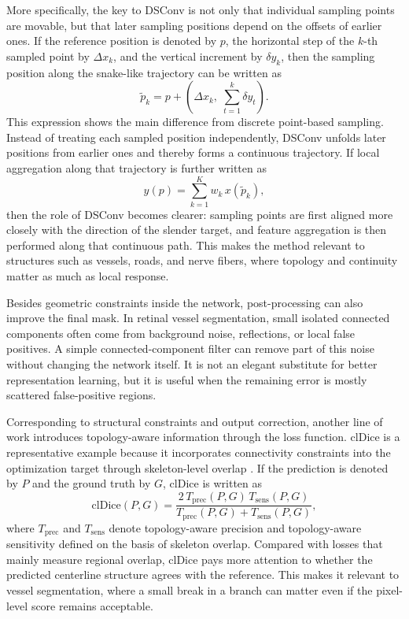 \documentclass[a4paper,11pt]{article}
\begin{document}
More specifically, the key to DSConv is not only that individual sampling points are movable, but that later sampling positions depend on the offsets of earlier ones. If the reference position is denoted by \(p\), the horizontal step of the \(k\)-th sampled point by \(\Delta x_k\), and the vertical increment by \(\delta y_k\), then the sampling position along the snake-like trajectory can be written as
\begin{equation}
\tilde{p}_k = p + \left(\Delta x_k,\; \sum_{t=1}^{k}\delta y_t\right).
\end{equation}
This expression shows the main difference from discrete point-based sampling. Instead of treating each sampled position independently, DSConv unfolds later positions from earlier ones and thereby forms a continuous trajectory. If local aggregation along that trajectory is further written as
\begin{equation}
y(p)=\sum_{k=1}^{K} w_k\,x(\tilde{p}_k),
\end{equation}
then the role of DSConv becomes clearer: sampling points are first aligned more closely with the direction of the slender target, and feature aggregation is then performed along that continuous path. This makes the method relevant to structures such as vessels, roads, and nerve fibers, where topology and continuity matter as much as local response.

Besides geometric constraints inside the network, post-processing can also improve the final mask. In retinal vessel segmentation, small isolated connected components often come from background noise, reflections, or local false positives. A simple connected-component filter can remove part of this noise without changing the network itself. It is not an elegant substitute for better representation learning, but it is useful when the remaining error is mostly scattered false-positive regions.

Corresponding to structural constraints and output correction, another line of work introduces topology-aware information through the loss function. clDice is a representative example because it incorporates connectivity constraints into the optimization target through skeleton-level overlap \cite{shit2021cldice}. If the prediction is denoted by \(P\) and the ground truth by \(G\), clDice is written as
\begin{equation}
\mathrm{clDice}(P,G)=
\frac{2\,T_{\mathrm{prec}}(P,G)\,T_{\mathrm{sens}}(P,G)}
{T_{\mathrm{prec}}(P,G)+T_{\mathrm{sens}}(P,G)},
\end{equation}
where \(T_{\mathrm{prec}}\) and \(T_{\mathrm{sens}}\) denote topology-aware precision and topology-aware sensitivity defined on the basis of skeleton overlap. Compared with losses that mainly measure regional overlap, clDice pays more attention to whether the predicted centerline structure agrees with the reference. This makes it relevant to vessel segmentation, where a small break in a branch can matter even if the pixel-level score remains acceptable.
\end{document}
